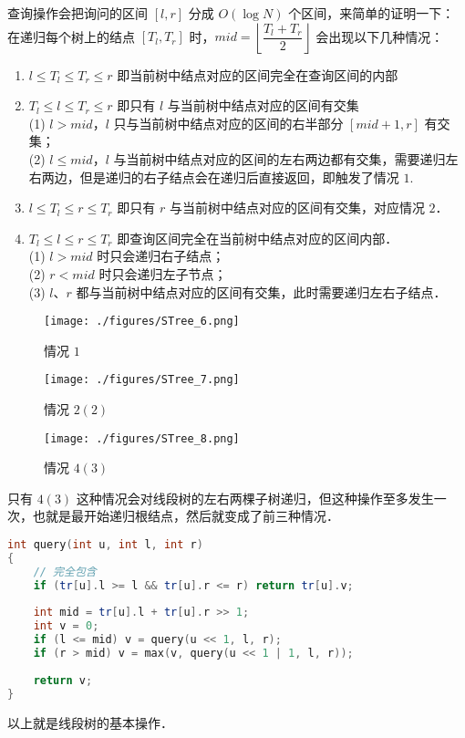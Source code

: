 查询操作会把询问的区间 $[l, r]$ 分成 $O(\log N)$ 个区间，来简单的证明一下：
在递归每个树上的结点 $[T_l, T_r]$ 时，$mid = \left\lfloor\dfrac{T_l+T_r}{2}\right\rfloor$ 会出现以下几种情况：

\begin{enumerate}
\item $l \leq T_l \leq T_r \leq r$ 即当前树中结点对应的区间完全在查询区间的内部
\item $T_l \leq l \leq T_r \leq r$ 即只有 $l$ 与当前树中结点对应的区间有交集\\
      (1) $l > mid$，$l$ 只与当前树中结点对应的区间的右半部分 $[mid + 1, r]$ 有交集； \\
      (2) $l \leq mid$，$l$ 与当前树中结点对应的区间的左右两边都有交集，需要递归左右两边，但是递归的右子结点会在递归后直接返回，即触发了情况 $1$.\\
\item $l \leq T_l \leq r \leq T_r$ 即只有 $r$ 与当前树中结点对应的区间有交集，对应情况 $2$．
\item $T_l \leq l \leq r \leq T_r$ 即查询区间完全在当前树中结点对应的区间内部．\\
      (1) $l > mid$ 时只会递归右子结点； \\
      (2) $r < mid$ 时只会递归左子节点； \\
      (3) $l$、$r$ 都与当前树中结点对应的区间有交集，此时需要递归左右子结点． \\

\end{enumerate}

\begin{figure}[ht]
\centering
\texttt{[image: ./figures/STree\_6.png]}
\caption{情况 $1$} \label{STree_fig6}
\end{figure}

\begin{figure}[ht]
\centering
\texttt{[image: ./figures/STree\_7.png]}
\caption{情况 $2(2)$} \label{STree_fig7}
\end{figure}

\begin{figure}[ht]
\centering
\texttt{[image: ./figures/STree\_8.png]}
\caption{情况 $4(3)$} \label{STree_fig8}
\end{figure}

只有 $4(3)$ 这种情况会对线段树的左右两棵子树递归，但这种操作至多发生一次，也就是最开始递归根结点，然后就变成了前三种情况．

\begin{lstlisting}[language=cpp]
int query(int u, int l, int r)
{
    // 完全包含
    if (tr[u].l >= l && tr[u].r <= r) return tr[u].v;  
    
    int mid = tr[u].l + tr[u].r >> 1;
    int v = 0;
    if (l <= mid) v = query(u << 1, l, r);
    if (r > mid) v = max(v, query(u << 1 | 1, l, r));
    
    return v;
}
\end{lstlisting}

以上就是线段树的基本操作．